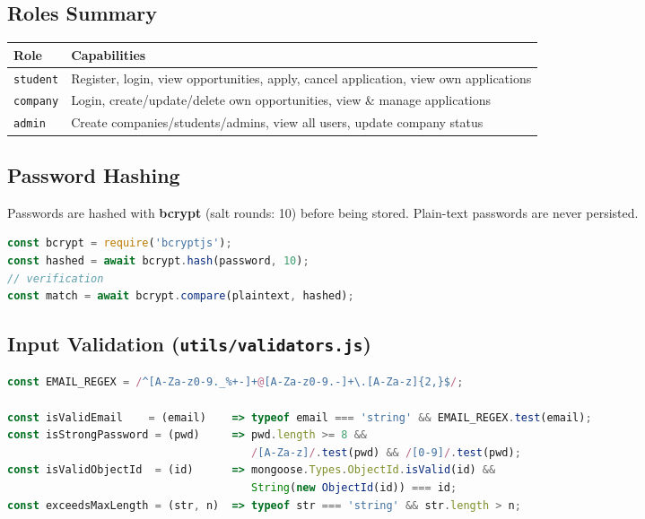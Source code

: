\documentclass[12pt,a4paper]{article}
\begin{document}
\subsection*{Roles Summary}

\begin{center}
\begin{tabular}{ll}
  \toprule
  \textbf{Role} & \textbf{Capabilities} \\
  \midrule
  \texttt{student} & Register, login, view opportunities, apply, cancel application, view own applications \\
  \texttt{company} & Login, create/update/delete own opportunities, view \& manage applications \\
  \texttt{admin}   & Create companies/students/admins, view all users, update company status \\
  \bottomrule
\end{tabular}
\end{center}

\subsection*{Password Hashing}

Passwords are hashed with \textbf{bcrypt} (salt rounds: 10) before being stored. Plain-text passwords are never persisted.

\begin{lstlisting}[language=JavaScript]
const bcrypt = require('bcryptjs');
const hashed = await bcrypt.hash(password, 10);
// verification
const match = await bcrypt.compare(plaintext, hashed);
\end{lstlisting}

\subsection*{Input Validation (\texttt{utils/validators.js})}

\begin{lstlisting}[language=JavaScript]
const EMAIL_REGEX = /^[A-Za-z0-9._%+-]+@[A-Za-z0-9.-]+\.[A-Za-z]{2,}$/;

const isValidEmail    = (email)    => typeof email === 'string' && EMAIL_REGEX.test(email);
const isStrongPassword = (pwd)     => pwd.length >= 8 &&
                                      /[A-Za-z]/.test(pwd) && /[0-9]/.test(pwd);
const isValidObjectId  = (id)      => mongoose.Types.ObjectId.isValid(id) &&
                                      String(new ObjectId(id)) === id;
const exceedsMaxLength = (str, n)  => typeof str === 'string' && str.length > n;
\end{lstlisting}
\end{document}
